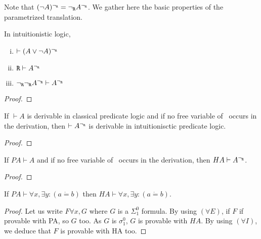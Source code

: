 Note that $(\neg A)^{\neg_{\texttt{R}}} = {\neg_{\texttt{R}}} A^{\neg_{\texttt{R}}}$. We gather here the basic properties of the parametrized translation.

\begin{proposition}
    In intuitionistic logic,
    \begin{enumerate}[(i)]
        \item $\vdash (A\vee \neg A)^{\neg_{\texttt{R}}}$
        \item $\texttt{R} \vdash A^{\neg_{\texttt{R}}}$
        \item ${\neg_{\texttt{R}}}{\neg_{\texttt{R}}} A^{\neg_{\texttt{R}}} \vdash A^{\neg_{\texttt{R}}}$
    \end{enumerate}
\end{proposition}
\begin{proof}
    
\end{proof}

\begin{theoreme}
    If $\vdash A$ is derivable in classical predicate logic and if no free variable of \R\, occurs in the derivation, then $\vdash A^{\neg_{\texttt{R}}}$ is derivable in intuitionisctic predicate logic.
\end{theoreme}
\begin{proof}

\end{proof}

\begin{theoreme}
    If $PA \vdash A$ and if no free variable of \R\, occurs in the derivation, then $HA \vdash A^{\neg_{\texttt{R}}}$.
\end{theoreme}
\begin{proof}
    
\end{proof}

\begin{theoreme}
    If $PA\vdash \forall x,\exists y:(a\dot{=}b)$ then $HA\vdash \forall x, \exists y: (a\dot{=}b)$.
\end{theoreme}
\begin{proof}
    Let us write $F \forall x,G$ where $G$ is a $\Sigma_1^0$ formula. By using $(\forall E)$, if $F$ if provable with PA, so $G$ too. As $G$ is $\sigma_1^0$, $G$ is provable with $HA$. By using $(\forall I)$, we deduce that $F$ is provable with HA too.
\end{proof}


